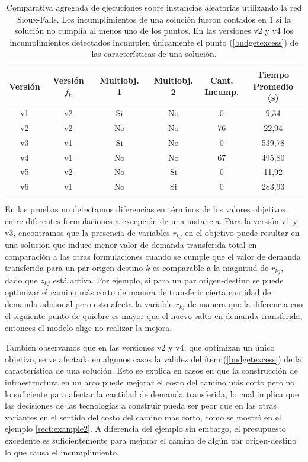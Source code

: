 \begin{table}[h!]
  \centering
  \begin{tabular}{cccccc}
    \toprule
    Versión & Versión $f_k$ & Multiobj. 1 & Multiobj. 2 & \shortstack{Cant. \\ Incump.} & \shortstack{Tiempo \\ Promedio (s)} \\
    \midrule
    v1 & v2 & Si & No & 0   & 9,34    \\
    v2 & v2 & No & No & 76  & 22,94   \\
    v3 & v1 & Si & No & 0   & 539,78  \\
    v4 & v1 & No & No & 67  & 495,80  \\
    v5 & v2 & No & Si & 0   & 11,92   \\
    v6 & v1 & No & Si & 0   & 283,93  \\
    \bottomrule
  \end{tabular}
  \caption{Comparativa agregada de ejecuciones sobre instancias aleatorias utilizando la red Sioux-Falls. Los incumplimientos de una solución fueron contados en 1 si la solución no cumplía al menos uno de los puntos. En las versiones v2 y v4 los incumplimientos detectados incumplen únicamente el punto (\ref{budgetexcess}) de las características de una solución.}\label{table:resumenejecuciones}
\end{table}

En las pruebas no detectamos diferencias en términos de los valores objetivos entre diferentes formulaciones a excepción de una instancia. Para la versión v1 y v3, encontramos que la presencia de variables $r_{kj}$ en el objetivo puede resultar en una solución que induce menor valor de demanda transferida total en comparación a las otras formulaciones cuando se cumple que el valor de demanda transferida para un par origen-destino $k$ es comparable a la magnitud de $r_{kj}$, dado que $z_{kj}$ está activa. Por ejemplo, si para un par origen-destino se puede optimizar el camino más corto de manera de transferir cierta cantidad de demanda adicional pero esto afecta la variable $r_{kj}$ de manera que la diferencia con el siguiente punto de quiebre es mayor que el nuevo salto en demanda transferida, entonces el modelo elige no realizar la mejora.

También observamos que en las versiones v2 y v4, que optimizan un único objetivo, se ve afectada en algunos casos la validez del ítem (\ref{budgetexcess}) de la característica de una solución. Esto se explica en casos en que la construcción de infraestructura en un arco puede mejorar el costo del camino más corto pero no lo suficiente para afectar la cantidad de demanda transferida, lo cual implica que las decisiones de las tecnologías a construir pueda ser peor que en las otras variantes en el sentido del costo del camino más corto, como se mostró en el ejemplo \ref{sect:example2}. A diferencia del ejemplo sin embargo, el presupuesto excedente es suficientemente para mejorar el camino de algún par origen-destino lo que causa el incumplimiento.

